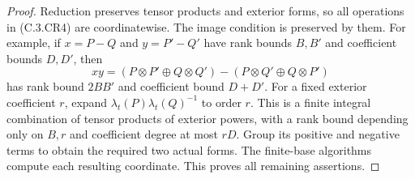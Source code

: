 \begin{proof}
Reduction preserves tensor products and exterior
forms, so all operations in (C.3.CR4) are coordinatewise.
The image condition is preserved by them.
For example, if $x=P-Q$ and $y=P'-Q'$ have rank
bounds $B,B'$ and coefficient bounds $D,D'$,
then
\[
 xy=(P\otimes P'\oplus Q\otimes Q')
       -(P\otimes Q'\oplus Q\otimes P')
\]
has rank bound $2BB'$ and coefficient bound $D+D'$.
For a fixed exterior coefficient $r$,
expand $\lambda_t(P)\lambda_t(Q)^{-1}$ to order $r$.
This is a finite integral combination of tensor
products of exterior powers, with a rank bound
depending only on $B,r$ and coefficient degree
at most $rD$. Group its positive and negative
terms to obtain the required two actual forms.
The finite-base algorithms compute each resulting
coordinate. This proves all remaining assertions.
\end{proof}

